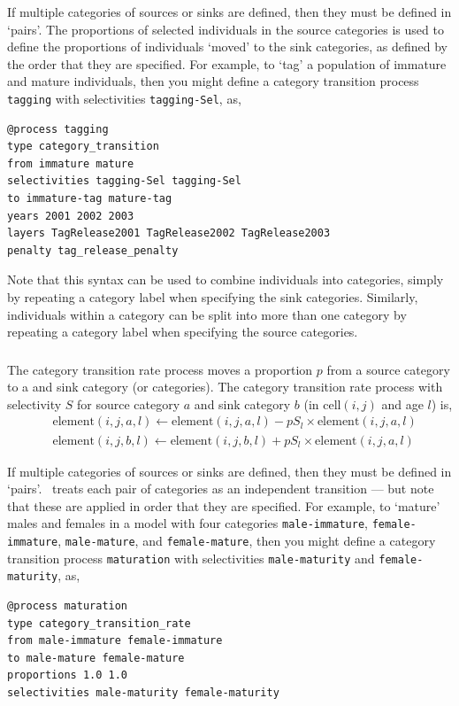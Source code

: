 If multiple categories of sources or sinks are defined, then they must be defined in `pairs'. The proportions of selected individuals in the source categories is used to define the proportions of individuals `moved' to the sink categories, as defined by the order that they are specified. For example, to `tag' a population of immature and mature individuals, then you might define a category transition process \texttt{tagging} with selectivities \texttt{tagging-Sel}, as,
{\small{\begin{verbatim}
@process tagging
type category_transition
from immature mature
selectivities tagging-Sel tagging-Sel
to immature-tag mature-tag
years 2001 2002 2003
layers TagRelease2001 TagRelease2002 TagRelease2003
penalty tag_release_penalty
\end{verbatim}}}

Note that this syntax can be used to combine individuals into categories, simply by repeating a category label when specifying the sink categories. Similarly, individuals within a category can be split into more than one category by repeating a category label when specifying the source categories.

\subsubsection*{}

The category transition rate process moves a proportion $p$ from a source category to a and sink category (or categories). The category transition rate process with selectivity $S$ for source category $a$ and sink category $b$ (in cell$(i,j)$ and age $l$) is,
\begin{equation}\begin{split}
  & \text{element}(i,j,a,l) \leftarrow \text{element}(i,j,a,l) - pS_l \times \text{element}(i,j,a,l) \\
  & \text{element}(i,j,b,l) \leftarrow \text{element}(i,j,b,l) + pS_l \times \text{element}(i,j,a,l)
\end{split}\end{equation}

If multiple categories of sources or sinks are defined, then they must be defined in `pairs'. \SPM\ treats each pair of categories as an independent transition --- but note that these are applied in order that they are specified. For example, to `mature' males and females in a model with four categories \texttt{male-immature}, \texttt{female-immature}, \texttt{male-mature}, and \texttt{female-mature}, then you might define a category transition process \texttt{maturation} with selectivities \texttt{male-maturity} and \texttt{female-maturity}, as,
{\small{\begin{verbatim}
@process maturation
type category_transition_rate
from male-immature female-immature
to male-mature female-mature
proportions 1.0 1.0
selectivities male-maturity female-maturity
\end{verbatim}}}

